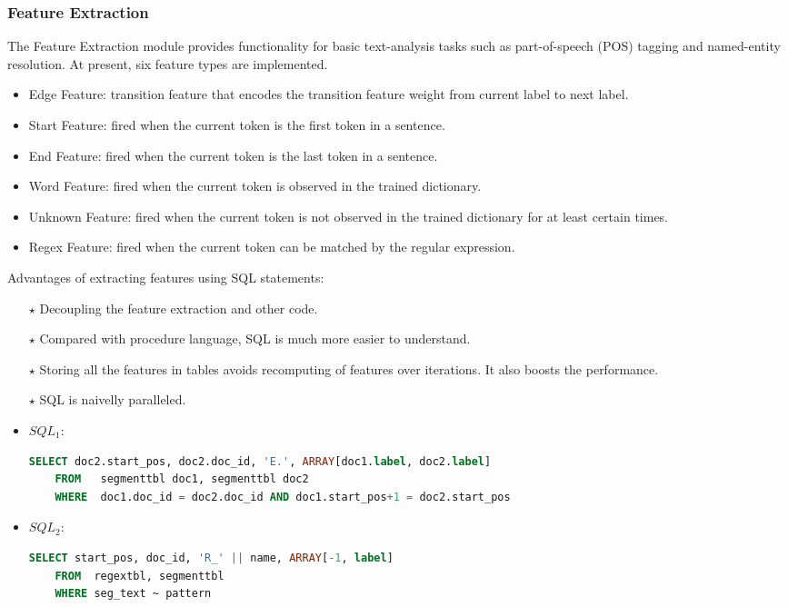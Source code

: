 \documentclass[11pt,letterpaper]{article}
\begin{document}
\subsubsection{Feature Extraction}
The Feature Extraction module provides functionality for basic text-analysis
tasks such as part-of-speech (POS) tagging and named-entity resolution.
At present, six feature types are implemented.
\begin{itemize}
\item Edge Feature: transition feature that encodes the transition feature weight from current label to next label.
\item Start Feature: fired when the current token is the first token in a sentence.
\item End Feature: fired when the current token is the last token in a sentence.
\item Word Feature: fired when the current token is observed in the trained dictionary.
\item Unknown Feature: fired when the current token is not observed in the trained dictionary for at least certain times.
\item Regex Feature: fired when the current token can be matched by the regular expression.
\end{itemize}

Advantages of extracting features using SQL statements:
\begin{itemize}
\item [$\star$] Decoupling the feature extraction and other code.
\item [$\star$] Compared with procedure language, SQL is much more easier to understand.
\item [$\star$] Storing all the features in tables avoids recomputing of features over iterations. It also boosts the performance.
\item [$\star$] SQL is naivelly paralleled.
\end{itemize}

\begin{itemize}
\item $SQL_1$:\\
\begin{lstlisting}[language=SQL,gobble=4]
    SELECT doc2.start_pos, doc2.doc_id, 'E.', ARRAY[doc1.label, doc2.label]
    FROM   segmenttbl doc1, segmenttbl doc2
    WHERE  doc1.doc_id = doc2.doc_id AND doc1.start_pos+1 = doc2.start_pos
\end{lstlisting}

\item $SQL_2$:\\
\begin{lstlisting}[language=SQL,gobble=4]
    SELECT start_pos, doc_id, 'R_' || name, ARRAY[-1, label]
    FROM  regextbl, segmenttbl
    WHERE seg_text ~ pattern
\end{lstlisting}
\end{itemize}
\end{document}
